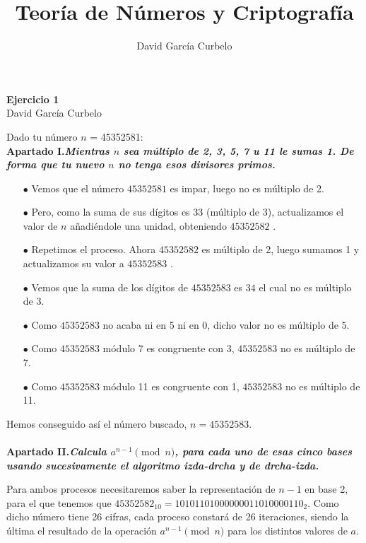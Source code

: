 \documentclass[fleqn]{article}
\author{David García Curbelo}
\title{Teoría de Números y Criptografía}
\begin{document}
    \begin{center}
        \LARGE{\textbf{Ejercicio 1}} \\
        \Large{David García Curbelo} \\
    \end{center}

    \vspace{1cm}
    
    Dado tu número $n$ = 45352581: \\ 

    \textbf{Apartado I.\textit{Mientras $n$ sea múltiplo de 2, 3, 5, 7 u 11 le sumas 1. De forma que tu nuevo $n$ no tenga esos 
    divisores primos.}}
    \begin{enumerate}
        \item[$\bullet$] Vemos que el número $45352581$ es impar, luego no es múltiplo de 2. 
        \item[$\bullet$] Pero, como la suma de sus dígitos es $33$ (múltiplo de 3), actualizamos el valor de $n$ añadiéndole una unidad,
                obteniendo $45352582$ . 
        \item[$\bullet$] Repetimos el proceso. Ahora $45352582$ es múltiplo de 2, luego sumamos 1 y actualizamos su valor a $45352583$ . 
        \item[$\bullet$] Vemos que la suma de los dígitos de $45352583$ es $34$ el cual no es múltiplo de 3. 
        \item[$\bullet$] Como $45352583$ no acaba ni en 5 ni en 0, dicho valor no es múltiplo de 5. 
        \item[$\bullet$] Como $45352583$ módulo 7 es congruente con 3, $45352583$ no es múltiplo de 7. 
        \item[$\bullet$] Como $45352583$ módulo 11 es congruente con 1, $45352583$ no es múltiplo de 11.
    \end{enumerate}

    Hemos conseguido así el número buscado, $n = 45352583$.\\ \\
     
    \newpage
    \textbf{Apartado II.\textit{Calcula $a^{n-1} \pmod{n}$, para cada uno de esas cinco bases usando sucesivamente 
    el algoritmo izda-drcha y de drcha-izda.}}

    Para ambos procesos necesitaremos saber la representación de $n-1$ en base 2, para el que tenemos que 
    $45352582_{10} = 10101101000000011010000110_{2}$. Como dicho número tiene 26 cifras, cada proceso constará
    de 26 iteraciones, siendo la última el resultado de la operación $a^{n-1} \pmod{n}$ para los distintos
    valores de $a$.\\ 
\end{document}
